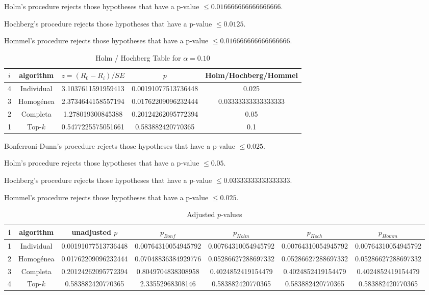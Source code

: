 \documentclass[a4paper,10pt]{article}
\begin{document}
\begin{landscape}
Holm's procedure rejects those hypotheses that have a p-value $\le0.016666666666666666$.


Hochberg's procedure rejects those hypotheses that have a p-value $\le0.0125$.


Hommel's procedure rejects those hypotheses that have a p-value $\le0.016666666666666666$.


\begin{table}[!htp]
\centering\tiny
\caption{Holm / Hochberg Table for $\alpha=0.10$}
\begin{tabular}{ccccc}
$i$&algorithm&$z=(R_0 - R_i)/SE$&$p$&Holm/Hochberg/Hommel\\
\hline
4&Individual&3.1037611591959413&0.00191077513736448&0.025\\
3&Homogénea&2.3734644158557194&0.01762209096232444&0.03333333333333333\\
2&Completa&1.278019300845388&0.20124262095772394&0.05\\
1&Top-$k$&0.5477225575051661&0.583882420770365&0.1\\
\hline
\end{tabular}
\end{table}
Bonferroni-Dunn's procedure rejects those hypotheses that have a p-value $\le0.025$.


Holm's procedure rejects those hypotheses that have a p-value $\le0.05$.


Hochberg's procedure rejects those hypotheses that have a p-value $\le0.03333333333333333$.


Hommel's procedure rejects those hypotheses that have a p-value $\le0.025$.


\begin{table}[!htp]
\centering\tiny
\caption{Adjusted $p$-values}
\begin{tabular}{ccccccc}
i&algorithm&unadjusted $p$&$p_{Bonf}$&$p_{Holm}$&$p_{Hoch}$&$p_{Homm}$\\
\hline
1&Individual&0.00191077513736448&0.00764310054945792&0.00764310054945792&0.00764310054945792&0.00764310054945792\\
2&Homogénea&0.01762209096232444&0.07048836384929776&0.05286627288697332&0.05286627288697332&0.05286627288697332\\
3&Completa&0.20124262095772394&0.8049704838308958&0.4024852419154479&0.4024852419154479&0.4024852419154479\\
4&Top-$k$&0.583882420770365&2.33552968308146&0.583882420770365&0.583882420770365&0.583882420770365\\
\hline
\end{tabular}
\end{table}


\end{landscape}
\end{document}
